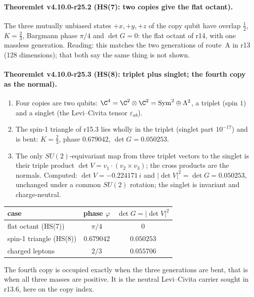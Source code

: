 \paragraph{Theoremlet v4.10.0-r25.2 (HS(7): two copies give the flat octant).}
The three mutually unbiased states \(+x,+y,+z\) of the copy qubit have overlap \(\tfrac12\), \(K=\tfrac23\), Bargmann phase \(\pi/4\) and
\(\det G=0\): the flat octant of r14, with one massless generation.  Reading: this matches the two generations of route~A in r13 (128
dimensions); that both say the same thing is not shown.

\paragraph{Theoremlet v4.10.0-r25.3 (HS(8): triplet plus singlet; the fourth copy as the normal).}
\begin{enumerate}[leftmargin=2em]
\item[(a)] Four copies are two qubits: \(\C^4=\C^2\otimes\C^2=\mathrm{Sym}^2\oplus\Lambda^2\), a triplet (spin \(1\)) and a singlet (the Levi--Civita
tensor \(\varepsilon_{ab}\)).
\item[(b)] The spin-1 triangle of r15.3 lies wholly in the triplet (singlet part \(10^{-17}\)) and is bent: \(K=\tfrac23\), phase \(0.679042\),
\(\det G=0.050253\).
\item[(c)] The only \(SU(2)\)-equivariant map from three triplet vectors to the singlet is their triple product \(\det V=v_1\cdot(v_2\times v_3)\);
the cross products are the normals.  Computed: \(\det V=-0.224171\,i\) and \(|\det V|^2=\det G=0.050253\), unchanged under a common \(SU(2)\)
rotation; the singlet is invariant and charge-neutral.
\end{enumerate}
\begin{center}
\small
\begin{tabular}{@{}lcc@{}}
\toprule
case & phase \(\varphi\) & \(\det G=|\det V|^2\)\\
\midrule
flat octant (HS(7)) & \(\pi/4\) & \(0\)\\
spin-1 triangle (HS(8)) & \(0.679042\) & \(0.050253\)\\
charged leptons & \(2/3\) & \(0.055706\)\\
\bottomrule
\end{tabular}
\end{center}
The fourth copy is occupied exactly when the three generations are bent, that is when all three masses are positive.  It is the neutral
Levi--Civita carrier sought in r13.6, here on the copy index.

